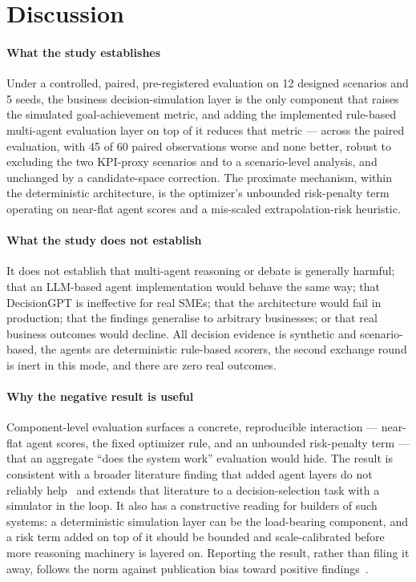 \documentclass[conference]{IEEEtran}
\begin{document}
\section{Discussion}
\label{sec:discussion}

\paragraph{What the study establishes}
Under a controlled, paired, pre-registered evaluation on 12 designed scenarios
and 5 seeds, the business decision-simulation layer is the only component that
raises the simulated goal-achievement metric, and adding the implemented
rule-based multi-agent evaluation layer on top of it reduces that metric ---
across the paired evaluation, with 45 of 60 paired observations worse and none
better, robust to excluding the two KPI-proxy scenarios and to a scenario-level
analysis, and unchanged by a candidate-space correction. The proximate
mechanism, within the deterministic architecture, is the optimizer's unbounded
risk-penalty term operating on near-flat agent scores and a mis-scaled
extrapolation-risk heuristic.

\paragraph{What the study does not establish}
It does not establish that multi-agent reasoning or debate is generally harmful;
that an LLM-based agent implementation would behave the same way; that
DecisionGPT is ineffective for real SMEs; that the architecture would fail in
production; that the findings generalise to arbitrary businesses; or that real
business outcomes would decline. All decision evidence is synthetic and
scenario-based, the agents are deterministic rule-based scorers, the second
exchange round is inert in this mode, and there are zero real outcomes.

\paragraph{Why the negative result is useful}
Component-level evaluation surfaces a concrete, reproducible interaction ---
near-flat agent scores, the fixed optimizer rule, and an unbounded risk-penalty
term --- that an aggregate ``does the system work'' evaluation would hide. The
result is consistent with a broader literature finding that added agent layers
do not reliably help~\cite{Wang2024,Smit2024,Huang2024,Cemri2025} and extends
that literature to a decision-selection task with a simulator in the loop. It
also has a constructive reading for builders of such systems: a deterministic
simulation layer can be the load-bearing component, and a risk term added on top
of it should be bounded and scale-calibrated before more reasoning machinery is
layered on. Reporting the result, rather than filing it away, follows the norm
against publication bias toward positive findings~\cite{Rosenthal1979}.
\end{document}
